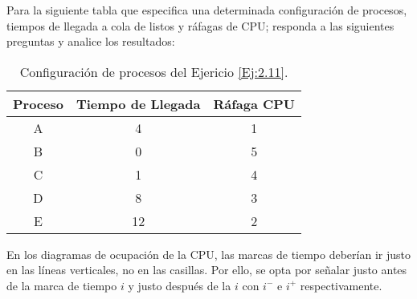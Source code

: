 \begin{ejercicio}\label{Ej:2.11}
    Para la siguiente tabla que especifica una determinada configuración de procesos, tiempos de llegada a cola de listos y ráfagas de CPU; responda a las siguientes preguntas y analice los resultados:
    \begin{table}[H]
        \centering
        \begin{tabular}{c|c|c}
            Proceso & Tiempo de Llegada & Ráfaga CPU \\ \hline \hline
            A & 4 & 1 \\
            B & 0 & 5 \\
            C & 1 & 4 \\
            D & 8 & 3 \\
            E & 12 & 2 \\
        \end{tabular}
        \caption{Configuración de procesos del Ejericio \ref{Ej:2.11}.}
        \label{tab:ej2.11}
    \end{table}

    \begin{observacion}
       En los diagramas de ocupación de la CPU, las marcas de tiempo deberían ir justo en las líneas verticales, no en las casillas. Por ello, se opta por señalar justo antes de la marca de tiempo $i$ y justo después de la $i$ con $i^-$ e $i^+$ respectivamente.
    \end{observacion}
    

\end{ejercicio}
